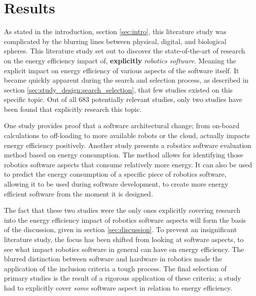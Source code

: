 \section{Results}
\label{sec:results}
As stated in the introduction, section \ref{sec:intro}, this literature study was complicated by 
the blurring lines between physical, digital, and biological spheres.
This literature study set out to discover the state-of-the-art of research on the energy efficiency impact of, \textbf{explicitly} \textit{robotics software}.
Meaning the explicit impact on energy efficiency of various aspects of the software itself.
It became quickly apparent during the search and selection process, as described in section \ref{sec:study_design:search_selection}, 
that few studies existed on this specific topic.
Out of all 683 potentially relevant studies, only two studies have been found that explicitly research this topic.

\vspace{2mm}

One study \cite{rahman2019cloud_robot_offloading} provides proof that a software architectural change; 
from on-board calculations to off-loading to more available robots or the cloud, actually impacts energy efficiency positively.
Another study \cite{hou2017novel_cloud_evaluation_model} presents a robotics software evaluation method based on energy consumption.
The method allows for identifying those robotics software aspects that consume relatively more energy. 
It can also be used to predict the energy consumption of a specific piece of robotics software, allowing it to be used during software development, 
to create more energy efficient software from the moment it is designed.

\vspace{2mm}

The fact that these two studies were the only ones explicitly covering research into the energy efficiency impact of robotics software aspects will
form the basis of the discussion, given in section \ref{sec:discussion}.
To prevent an insignificant literature study, the focus has been shifted from looking at software aspects, to see what impact 
robotics software in general can have on energy efficiency. The blurred distinction between software and hardware in robotics made the 
application of the inclusion criteria a tough process.
The final selection of primary studies is the result of a rigorous application of these criteria; 
a study had to explicitly cover \textit{some} software aspect in relation to energy efficiency.

